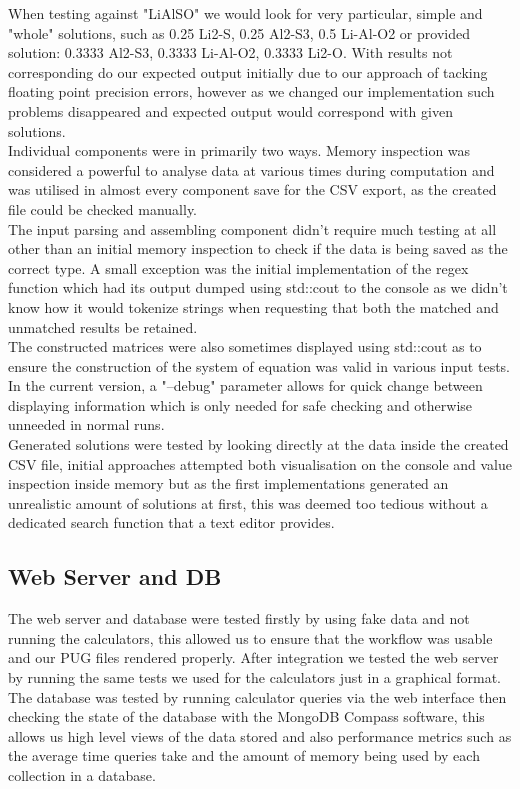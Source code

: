 When testing against "LiAlSO" we would look for very particular, simple and "whole" solutions, such as 0.25 Li2-S, 0.25 Al2-S3, 0.5 Li-Al-O2 or provided solution: 0.3333 Al2-S3, 0.3333 Li-Al-O2, 0.3333 Li2-O. With results not corresponding do our expected output initially due to our approach of tacking floating point precision errors, however as we changed our implementation such problems disappeared and expected output would correspond with given solutions. \\

Individual components were in primarily two ways. Memory inspection was considered a powerful to analyse data at various times during computation and was utilised in almost every component save for the CSV export, as the created file could be checked manually. \\ 

The input parsing and assembling component didn't require much testing at all other than an initial memory inspection to check if the data is being saved as the correct type. A small exception was the initial implementation of the regex function which had its output dumped using std::cout to the console as we didn't know how it would tokenize strings when requesting that both the matched and unmatched results be retained. \\

The constructed matrices were also sometimes displayed using std::cout as to ensure the construction of the system of equation was valid in various input tests. In the current version, a "--debug" parameter allows for quick change between displaying information which is only needed for safe checking and otherwise unneeded in normal runs. \\

Generated solutions were tested by looking directly at the data inside the created CSV file, initial approaches attempted both visualisation on the console and value inspection inside memory but as the first implementations generated an unrealistic amount of solutions at first, this was deemed too tedious without a dedicated search function that a text editor provides. \\

\subsection{Web Server and DB}
The web server and database were tested firstly by using fake data and not running the calculators, this allowed us to ensure that the workflow was usable and our PUG files rendered properly. After integration we tested the web server by running the same tests we used for the calculators just in a graphical format. The database was tested by running calculator queries via the web interface then checking the state of the database with the MongoDB Compass software, this allows us high level views of the data stored and also performance metrics such as the average time queries take and the amount of memory being used by each collection in a database.